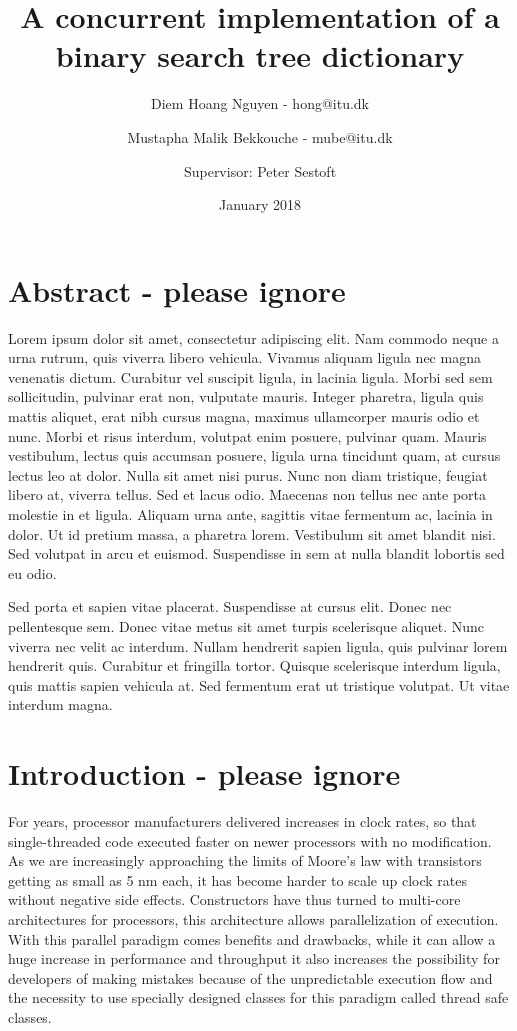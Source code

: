 \documentclass{article}
\title{A concurrent implementation of a binary search tree dictionary}
\author{Diem Hoang Nguyen - hong@itu.dk  \and Mustapha Malik Bekkouche - mube@itu.dk \and Supervisor: Peter Sestoft}
\date{January 2018}
\begin{document}
\maketitle

\section{Abstract - please ignore}

 Lorem ipsum dolor sit amet, consectetur adipiscing elit. Nam commodo neque a urna rutrum, quis viverra libero vehicula. Vivamus aliquam ligula nec magna venenatis dictum. Curabitur vel suscipit ligula, in lacinia ligula. Morbi sed sem sollicitudin, pulvinar erat non, vulputate mauris. Integer pharetra, ligula quis mattis aliquet, erat nibh cursus magna, maximus ullamcorper mauris odio et nunc. Morbi et risus interdum, volutpat enim posuere, pulvinar quam. Mauris vestibulum, lectus quis accumsan posuere, ligula urna tincidunt quam, at cursus lectus leo at dolor. Nulla sit amet nisi purus. Nunc non diam tristique, feugiat libero at, viverra tellus. Sed et lacus odio. Maecenas non tellus nec ante porta molestie in et ligula. Aliquam urna ante, sagittis vitae fermentum ac, lacinia in dolor. Ut id pretium massa, a pharetra lorem. Vestibulum sit amet blandit nisi. Sed volutpat in arcu et euismod. Suspendisse in sem at nulla blandit lobortis sed eu odio.

Sed porta et sapien vitae placerat. Suspendisse at cursus elit. Donec nec pellentesque sem. Donec vitae metus sit amet turpis scelerisque aliquet. Nunc viverra nec velit ac interdum. Nullam hendrerit sapien ligula, quis pulvinar lorem hendrerit quis. Curabitur et fringilla tortor. Quisque scelerisque interdum ligula, quis mattis sapien vehicula at. Sed fermentum erat ut tristique volutpat. Ut vitae interdum magna. 


\newpage

\tableofcontents

\newpage

\section{Introduction - please ignore}
For years, processor manufacturers delivered increases in clock rates, so that single-threaded code executed faster on newer processors with no modification. As we are increasingly approaching the limits of Moore's law with transistors getting as small as 5 nm each, it has become harder to scale up clock rates without negative side effects. Constructors have thus turned to multi-core architectures for processors, this architecture allows parallelization of execution. With this parallel paradigm comes benefits and drawbacks, while it can allow a huge increase in performance and throughput it also increases the possibility for developers of making mistakes because of the unpredictable execution flow and the necessity to use specially designed classes for this paradigm called thread safe classes. 
\end{document}
